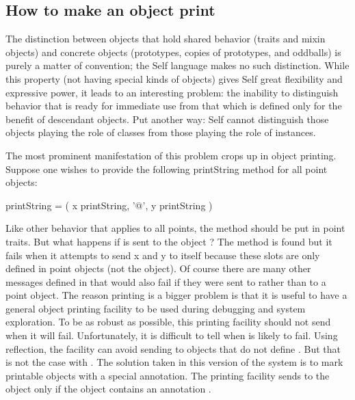 \documentclass[letterpaper,10pt,english]{sphinxmanual}
\begin{document}
\subsection{How to make an object print}
\label{\detokenize{progguid:how-to-make-an-object-print}}\label{\detokenize{progguid:id1}}
The distinction between objects that hold shared behavior (traits and mixin objects) and concrete
objects (prototypes, copies of prototypes, and oddballs) is purely a matter of convention; the Self
language makes no such distinction. While this property (not having special kinds of objects) gives
Self great flexibility and expressive power, it leads to an interesting problem: the inability to distinguish
behavior that is ready for immediate use from that which is defined only for the benefit of
descendant objects. Put another way: Self cannot distinguish those objects playing the role of
classes from those playing the role of instances.

The most prominent manifestation of this problem crops up in object printing. Suppose one wishes
to provide the following printString method for all point objects:

\begin{sphinxVerbatim}[commandchars=\\\{\}]
printString = ( x printString, ’@’, y printString )
\end{sphinxVerbatim}

Like other behavior that applies to all points, the method should be put in point traits. But what
happens if  is sent to the object ? The  method is
found but it fails when it attempts to send x and y to itself because these slots are only defined in
point objects (not the  object). Of course there are many other messages defined in
 that would also fail if they were sent to  rather than to a point
object. The reason printing is a bigger problem is that it is useful to have a general object printing
facility to be used during debugging and system exploration. To be as robust as possible, this printing
facility should not send  when it will fail. Unfortunately, it is difficult to tell
when  is likely to fail. Using reflection, the facility can avoid sending
 to objects that do not define . But that is not the case with .
The solution taken in this version of the system is to mark printable objects with a special
annotation. The printing facility sends  to the object only if the object contains an
annotation .
\end{document}
